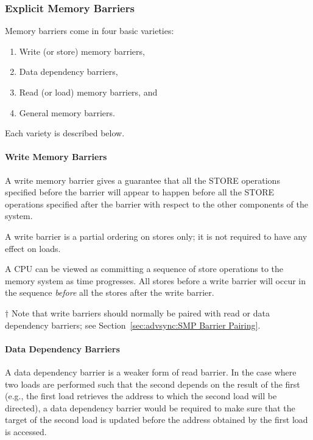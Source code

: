 \subsubsection{Explicit Memory Barriers}
\label{sec:advsync:Explicit Memory Barriers}

Memory barriers come in four basic varieties:

\begin{enumerate}
\item	Write (or store) memory barriers,
\item	Data dependency barriers,
\item	Read (or load) memory barriers, and
\item	General memory barriers.
\end{enumerate}

Each variety is described below.

\paragraph{Write Memory Barriers}

A write memory barrier gives a guarantee that all the STORE operations
specified before the barrier will appear to happen before all the STORE
operations specified after the barrier with respect to the other
components of the system.

A write barrier is a partial ordering on stores only; it is not required
to have any effect on loads.

A CPU can be viewed as committing a sequence of store operations to the
memory system as time progresses.  All stores before a write barrier will
occur in the sequence \emph{before} all the stores after the write barrier.

$\dagger$ Note that write barriers should normally be paired with read
or data dependency barriers; see
Section~\ref{sec:advsync:SMP Barrier Pairing}.

\paragraph{Data Dependency Barriers}

A data dependency barrier is a weaker form of read barrier.  In the case
where two loads are performed such that the second depends on the result
of the first (e.g., the first load retrieves the address to which the second
load will be directed), a data dependency barrier would be required to
make sure that the target of the second load is updated before the address
obtained by the first load is accessed.

